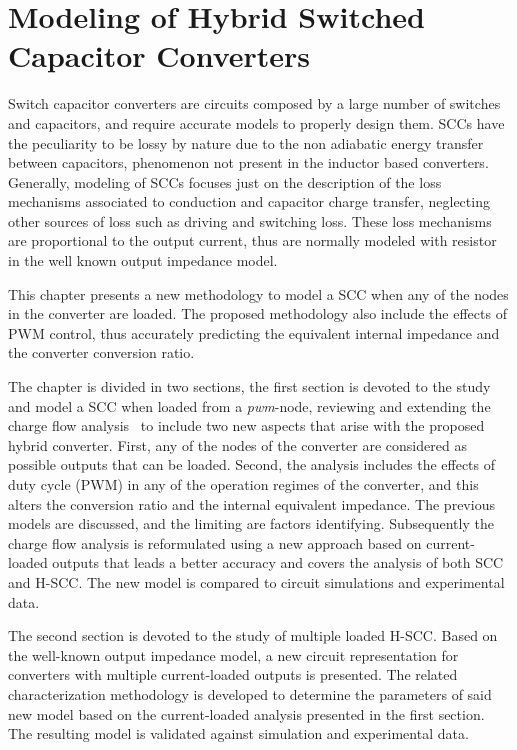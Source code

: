 \chapter[Modeling of H-SCC]{Modeling of Hybrid Switched Capacitor Converters}

Switch capacitor converters are circuits composed by a large number of switches and capacitors, and require accurate models to properly design them. SCCs have the peculiarity to be lossy by nature due to the non adiabatic energy transfer between capacitors, phenomenon not present in the inductor based converters. Generally, modeling of SCCs focuses just on  the description of the loss mechanisms associated to conduction and capacitor charge transfer, neglecting other sources of loss such as driving and switching loss. These loss mechanisms are proportional to the output current, thus are normally modeled with resistor in the well known output impedance model.

This chapter presents a new methodology to model a SCC when any of the nodes in the converter are loaded. The proposed methodology also include the effects of PWM control, thus accurately predicting the equivalent internal impedance and the converter conversion ratio.

The chapter is divided in two sections, the first section is devoted to the study and model a SCC when loaded from a \emph{pwm}-node, reviewing and extending the charge flow analysis~\cite{95Makowski,Seeman:EECS-2009-78} to include two new aspects that arise with the proposed hybrid converter. First, any of the nodes of the converter are considered as possible outputs that can be loaded. Second, the analysis includes the effects of duty cycle (PWM) in any of the operation regimes of the converter, and this alters the conversion ratio and the internal equivalent impedance. The previous models are discussed, and the limiting are factors identifying. Subsequently the charge flow analysis is reformulated using a new approach based on current-loaded outputs that leads a better accuracy and covers the analysis of both SCC and H-SCC. The new model is compared to circuit simulations and experimental data.

The second section is devoted to the study of multiple loaded H-SCC. Based on the well-known output impedance model, a new circuit representation for converters with multiple current-loaded outputs is presented. The related characterization methodology is developed to determine the parameters of said new model based on the current-loaded analysis presented in the first section. The resulting model is validated against simulation and experimental data.


